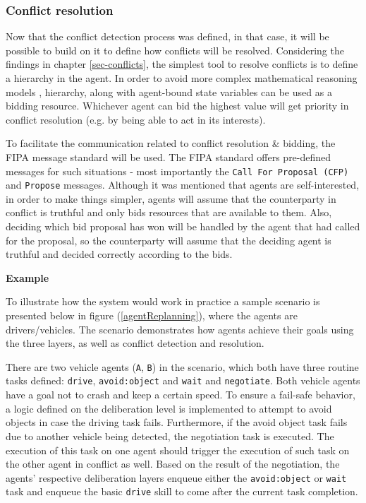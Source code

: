 \documentclass[main.tex]{subfiles}
\begin{document}
\subsubsection{Conflict resolution}

Now that the conflict detection process was defined, in that case, it will be possible to build
on it to define how conflicts will be resolved. Considering the findings in chapter
\ref{sec-conflicts}, the simplest tool to resolve conflicts is to define a hierarchy in the
agent. In order to avoid more complex mathematical reasoning models \cite{Binder2022},
hierarchy, along with agent-bound state variables can be used as a bidding resource. Whichever
agent can bid the highest value will get priority in conflict resolution (e.g. by being
able to act in its interests).

To facilitate the communication related to conflict resolution \& bidding, the FIPA message
standard will be used.  The FIPA standard offers pre-defined messages for such situations -
most importantly the \texttt{Call For Proposal (CFP)} and \texttt{Propose} messages. Although
it was mentioned that agents are self-interested, in order to make things simpler, agents will
assume that the counterparty in conflict is truthful and only bids resources that are
available to them. Also, deciding which bid proposal has won will be handled by the agent that
had called for the proposal, so the counterparty will assume that the deciding agent is
truthful and decided correctly according to the bids. 

\textbf{Example}

To illustrate how the system would work in practice a sample scenario is presented below in
figure (\ref{agentReplanning}), where the agents are drivers/vehicles. The scenario demonstrates 
how agents achieve their goals using the three layers, as well as conflict detection and resolution.

There are two vehicle agents (\texttt{A}, \texttt{B}) in the scenario, which both have three routine tasks defined:
\texttt{drive}, \texttt{avoid:object} and \texttt{wait} and \texttt{negotiate}. Both vehicle
agents have a goal not to crash and keep a certain speed. To ensure a fail-safe behavior, 
a logic defined on the deliberation level is implemented to attempt to avoid objects in case the driving task
fails. Furthermore, if the avoid object task fails due to another vehicle being detected, the negotiation 
task is executed. The execution of this task on one agent should trigger the execution of such task on the 
other agent in conflict as well. Based on the result of the negotiation, the agents' respective 
deliberation layers enqueue either the \texttt{avoid:object} or \texttt{wait} task and enqueue the 
basic \texttt{drive} skill to come after the current task completion.
\end{document}
